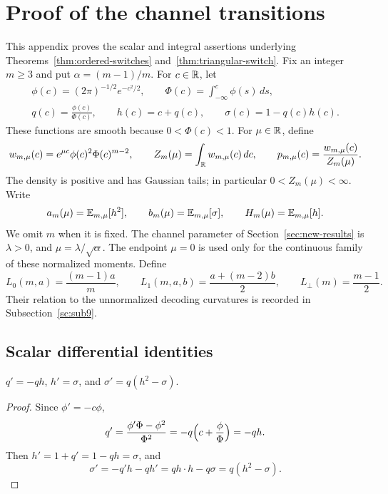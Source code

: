 \section{Proof of the channel transitions}\label{ap:transitions}

This appendix proves the scalar and integral assertions underlying
Theorems~\ref{thm:ordered-switches} and~\ref{thm:triangular-switch}.
Fix an integer \(m\ge3\) and put \(\alpha=(m-1)/m\).
For \(c\in\mathbb R\), let
\begin{gather*}
 \phi(c)=(2\pi)^{-1/2}e^{-c^2/2},\qquad
 \Phi(c)=\int_{-\infty}^{c}\phi(s)\,ds,\\
 q(c)=\frac{\phi(c)}{\Phi(c)},\qquad
 h(c)=c+q(c),\qquad \sigma(c)=1-q(c)h(c).
\end{gather*}
These functions are smooth because \(0<\Phi(c)<1\).
For \(\mu\in\mathbb R\), define
\begin{equation}\label{sc:tilted-law}
 w_{m,\mu}(c)=e^{\mu c}\phi(c)^2\Phi(c)^{m-2},\qquad
 Z_m(\mu)=\int_{\mathbb R}w_{m,\mu}(c)\,dc,\qquad
 p_{m,\mu}(c)=\frac{w_{m,\mu}(c)}{Z_m(\mu)} .
\end{equation}
The density is positive and has Gaussian tails; in particular
\(0<Z_m(\mu)<\infty\). Write
\[
 a_m(\mu)=\mathbb E_{m,\mu}[h^2],\qquad
 b_m(\mu)=\mathbb E_{m,\mu}[\sigma],\qquad
 H_m(\mu)=\mathbb E_{m,\mu}[h].
\]
We omit \(m\) when it is fixed. The channel parameter of
Section~\ref{sec:new-results} is \(\lambda>0\), and
\(\mu=\lambda/\sqrt{\alpha}\).
The endpoint \(\mu=0\) is used only for the continuous family of these
normalized moments. Define
\begin{equation}\label{sc:normalized-curvatures}
 L_0(m,a)=\frac{(m-1)a}{m},\qquad
 L_1(m,a,b)=\frac{a+(m-2)b}{2},\qquad
 L_\perp(m)=\frac{m-1}{2}.
\end{equation}
Their relation to the unnormalized decoding curvatures is recorded in
Subsection~\ref{sc:sub9}.


\subsection{Scalar differential identities}\label{sc:sub1}

\begin{lemma}\label{sc:lemma1.1}
\(q'=-qh\), \(h'=\sigma\), and \(\sigma'=q(h^2-\sigma)\).

\end{lemma}
\begin{proof}
Since \(\phi'=-c\phi\),
\[
q'=\frac{\phi'\Phi-\phi^2}{\Phi^2}=-q\Bigl(c+\frac{\phi}{\Phi}\Bigr)=-qh.
\]
Then \(h'=1+q'=1-qh=\sigma\), and
\[
\sigma'=-q'h-qh'=q h\cdot h-q\sigma=q(h^2-\sigma).
\]

\end{proof}

